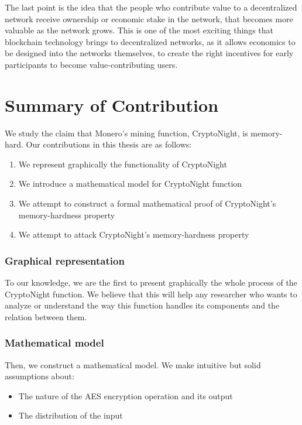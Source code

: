 The last point is the idea that the people who contribute value to a decentralized network receive ownership or economic stake in the network, that becomes more valuable as the network grows. This is one of the most exciting things that blockchain technology brings to decentralized networks, as it allows economics to be designed into the networks themselves, to create the right incentives for early participants to become value-contributing users.

\section{Summary of Contribution}
We study the claim that Monero's mining function, CryptoNight, is memory-hard. Our contributions in this thesis are as follows:

\begin{enumerate}
  \item We represent graphically the functionality of CryptoNight
  \item We introduce a mathematical model for CryptoNight function
  \item We attempt to construct a formal mathematical proof of CryptoNight's memory-hardness property
  \item We attempt to attack CryptoNight's memory-hardness property
\end{enumerate}

\subsubsection{Graphical representation}
To our knowledge, we are the first to present graphically the whole process of the CryptoNight function. We believe that this will help any researcher who wants to analyze or understand the way this function handles its components and the relation between them.

\subsubsection{Mathematical model}
Then, we construct a mathematical model. We make intuitive but solid assumptions about:

\begin{itemize}
  \item The nature of the AES encryption operation and its output
  \item The distribution of the input
\end{itemize}

